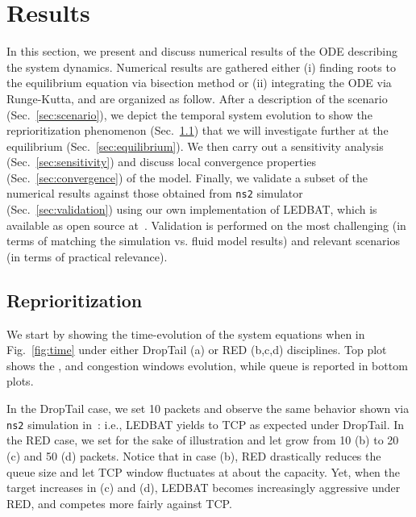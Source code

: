 \documentclass[conference]{IEEEtran}
\newcommand{\secR}[1]{Sec.~\ref{sec:#1}}
\newcommand{\secL}[1]{\label{sec:#1}}
\newcommand{\figR}[1]{Fig.~\ref{fig:#1}}
\begin{document}
 







\section{Results}\secL{results}
In this section, we present and discuss numerical results of the ODE describing the system dynamics. Numerical results are gathered either (i) finding roots to the equilibrium equation via bisection method or (ii) integrating the ODE via Runge-Kutta, and are organized as follow. After a description of the scenario (\secR{scenario}), we depict the temporal system evolution to show the reprioritization phenomenon (\secR{reprioritization}) that we will investigate further at the equilibrium (\secR{equilibrium}). We then carry out a sensitivity analysis (\secR{sensitivity}) and discuss local convergence properties (\secR{convergence}) of the model. Finally, we validate a subset of the numerical results against those obtained from \verb!ns2! simulator (\secR{validation}) using our own implementation of LEDBAT, which is available as open source at~\cite{ledbat_code}. Validation is performed on the most challenging (in terms of matching the simulation vs. fluid model results) and relevant  scenarios (in terms of practical relevance).



\subsection{Reprioritization}\secL{reprioritization}

We start by showing the time-evolution of the system equations when  in \figR{time} under either DropTail (a) or RED (b,c,d) disciplines. Top plot shows the ,  and  congestion windows evolution, while queue  is reported in bottom plots. 

In the DropTail case, we set 10 packets and observe the same behavior shown via \verb!ns2! simulation in~\cite{icccn10}: i.e., LEDBAT yields to TCP as expected under DropTail.
In the RED case, we set  for the sake of illustration and let  grow from 10 (b) to 20 (c) and 50 (d) packets.
Notice that in case (b),  RED drastically reduces the queue size and let TCP window fluctuates at about the capacity. Yet, when the target increases in (c) and (d), LEDBAT becomes increasingly aggressive under RED, and competes more fairly against TCP.
\end{document}
